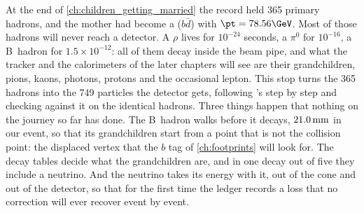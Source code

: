 At the end of \cref{ch:children_getting_married} the record held 365 primary
hadrons, and the mother had become a \Bstarbar ($b\bar d$) with
$\pt=78.56\GeV$. Most of those hadrons will never reach a detector. A $\rho$
lives for $10^{-24}$ seconds, a $\pi^0$ for $10^{-16}$, a B~hadron for
$1.5\times10^{-12}$: all of them decay inside the beam pipe, and what the
tracker and the calorimeters of the later chapters will see are their
grandchildren, pions, kaons, photons, protons and the occasional lepton. This
stop turns the 365 hadrons into the 749 particles the detector gets,
following \PYTHIA's  step by step and checking against it
on the identical hadrons. Three things happen that nothing on the journey so
far has done. The B~hadron walks before it decays, $21.0\,\mathrm{mm}$ in our event, so
that its grandchildren start from a point that is not the collision point:
the displaced vertex that the $b$ tag of \cref{ch:footprints} will look for.
The decay tables decide what the grandchildren are, and in one decay out of
five they include a neutrino. And the neutrino takes its energy with it, out
of the cone and out of the detector, so that for the first time the ledger
records a loss that no correction will ever recover event by event.

